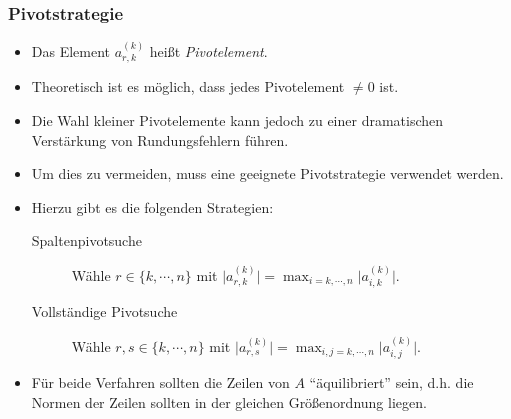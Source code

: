 \documentclass[a4paper, 11pt, accentcolor = tud3b]{tudreport}
\newcommand{\abs}[1]{\ensuremath{{\lvert #1 \rvert}}}
\begin{document}
	            \subsubsection{Pivotstrategie}
	                \begin{itemize}
	                	\item Das Element \( a_{r,k}^{(k)} \) heißt \textit{Pivotelement}.
	                	\item Theoretisch ist es möglich, dass jedes Pivotelement \( \neq 0 \) ist.
	                	\item Die Wahl kleiner Pivotelemente kann jedoch zu einer dramatischen Verstärkung von Rundungsfehlern führen.
	                	\item Um dies zu vermeiden, muss eine geeignete Pivotstrategie verwendet werden.
	                	\item Hierzu gibt es die folgenden Strategien:
		                	\begin{description}
		                		\item[Spaltenpivotsuche] Wähle \( r \in \{ k, \cdots, n \} \) mit \( \abs{a_{r,k}^{(k)}} = \max_{i = k, \cdots, n} \abs{a_{i,k}^{(k)}} \).
		                		\item[Vollständige Pivotsuche] Wähle \( r, s \in \{ k, \cdots, n \} \) mit \( \abs{a_{r,s}^{(k)}} = \max_{i, j = k, \cdots, n} \abs{a_{i,j}^{(k)}} \).
		                	\end{description}
	                	\item Für beide Verfahren sollten die Zeilen von \(A\) \enquote{äquilibriert} sein, d.h. die Normen der Zeilen sollten in der gleichen Größenordnung liegen.
	                \end{itemize}
	
\end{document}
